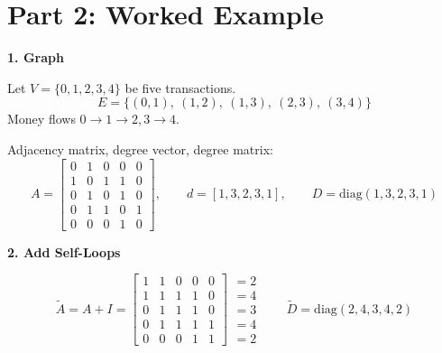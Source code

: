 \documentclass[12pt,a4paper]{article}
\newcommand{\h}[1]{\par\medskip\textbf{\large #1}\par}
\begin{document}
\newpage
\section*{Part 2: Worked Example}

\h{1. Graph}
Let $V = \{0, 1, 2, 3, 4\}$ be five transactions.
\[
  E = \{(0,1),\ (1,2),\ (1,3),\ (2,3),\ (3,4)\}
\]
Money flows $0 \rightarrow 1 \rightarrow 2, 3 \rightarrow 4$.

\begin{center}
\end{center}

Adjacency matrix, degree vector, degree matrix:
\[
  A = \begin{bmatrix}
  0&1&0&0&0\\ 1&0&1&1&0\\ 0&1&0&1&0\\ 0&1&1&0&1\\ 0&0&0&1&0
  \end{bmatrix}, \qquad d = [1, 3, 2, 3, 1], \qquad D = \mathrm{diag}(1, 3, 2, 3, 1)
\]

\h{2. Add Self-Loops}
\[
  \tilde A = A + I = \begin{bmatrix}
  1&1&0&0&0\\ 1&1&1&1&0\\ 0&1&1&1&0\\ 0&1&1&1&1\\ 0&0&0&1&1
  \end{bmatrix}
  \begin{matrix} =2\\=4\\=3\\=4\\=2 \end{matrix}
  \qquad \tilde D = \mathrm{diag}(2, 4, 3, 4, 2)
\]
\end{document}
